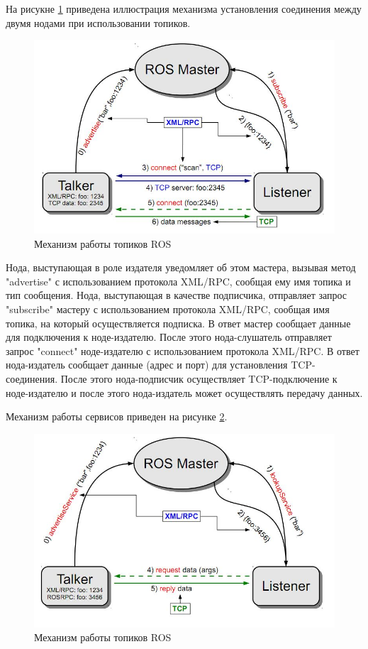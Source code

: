 На рисукне \ref{img:ros_topic_mechainism} приведена иллюстрация механизма установления соединения между двумя нодами
при использовании топиков.

\begin{figure}[h]
    \centering
    \includegraphics[width=\linewidth]{images/3_devel/ros_topic}
    \caption{Механизм работы топиков ROS}
    \label{img:ros_topic_mechainism}
\end{figure}

Нода, выступающая в роле издателя уведомляет об этом мастера, вызывая метод "advertise" с использованием протокола XML/RPC,
сообщая ему имя топика и тип сообщения. Нода, выступающая в качестве подписчика, отправляет запрос "subscribe" мастеру
с использованием протокола XML/RPC, сообщая имя топика, на который осуществляется подписка. В ответ мастер сообщает
данные для подключения к ноде-издателю. После этого нода-слушатель отправляет запрос "connect" ноде-издателю с
использованием протокола XML/RPC. В ответ нода-издатель сообщает данные (адрес и порт) для установления TCP-соединения.
После этого нода-подписчик осуществляет TCP-подключение к ноде-издателю и после этого нода-издатель может осуществлять
передачу данных.

Механизм работы сервисов приведен на рисунке \ref{img:ros_service_mechainism}.

\begin{figure}[h]
    \centering
    \includegraphics[width=\linewidth]{images/3_devel/ros_service}
    \caption{Механизм работы топиков ROS}
    \label{img:ros_service_mechainism}
\end{figure}

